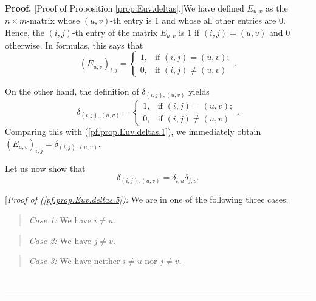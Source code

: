 \documentclass[numbers=enddot,12pt,final,onecolumn,notitlepage]{scrartcl}%
\theoremstyle{definition}
\newenvironment{statement}{\begin{quote}}{\end{quote}}
\newenvironment{proof}[1][Proof]{\noindent\textbf{#1.} }{\ \rule{0.5em}{0.5em}}
\begin{document}
\begin{proof}
[Proof of Proposition \ref{prop.Euv.deltas}.]We have defined $E_{u,v}$ as the
$n\times m$-matrix whose $\left(  u,v\right)  $-th entry is $1$ and whose all
other entries are $0$. Hence, the $\left(  i,j\right)  $-th entry of the
matrix $E_{u,v}$ is $1$ if $\left(  i,j\right)  =\left(  u,v\right)  $ and $0$
otherwise. In formulas, this says that%
\begin{equation}
\left(  E_{u,v}\right)  _{i,j}=%
\begin{cases}
1, & \text{if }\left(  i,j\right)  =\left(  u,v\right)  ;\\
0, & \text{if }\left(  i,j\right)  \neq\left(  u,v\right)
\end{cases}
. \label{pf.prop.Euv.deltas.1}%
\end{equation}


On the other hand, the definition of $\delta_{\left(  i,j\right)  ,\left(
u,v\right)  }$ yields%
\begin{equation}
\delta_{\left(  i,j\right)  ,\left(  u,v\right)  }=%
\begin{cases}
1, & \text{if }\left(  i,j\right)  =\left(  u,v\right)  ;\\
0, & \text{if }\left(  i,j\right)  \neq\left(  u,v\right)
\end{cases}
. \label{pf.prop.Euv.deltas.2}%
\end{equation}
Comparing this with (\ref{pf.prop.Euv.deltas.1}), we immediately obtain
$\left(  E_{u,v}\right)  _{i,j}=\delta_{\left(  i,j\right)  ,\left(
u,v\right)  }$.

Let us now show that
\begin{equation}
\delta_{\left(  i,j\right)  ,\left(  u,v\right)  }=\delta_{i,u}\delta_{j,v}.
\label{pf.prop.Euv.deltas.5}%
\end{equation}


[\textit{Proof of (\ref{pf.prop.Euv.deltas.5}):} We are in one of the
following three cases:

\begin{statement}
\textit{Case 1:} We have $i\neq u$.
\end{statement}

\begin{statement}
\textit{Case 2:} We have $j\neq v$.
\end{statement}

\begin{statement}
\textit{Case 3:} We have neither $i\neq u$ nor $j\neq v$.
\end{statement}


\end{proof}
\end{document}
